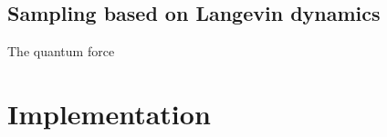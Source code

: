\documentclass[a4paper,10pt,twocolumn]{article} %
\begin{document}

\subsection{Sampling based on Langevin dynamics}%
The quantum force



\section{Implementation}%




%
%
%
\end{document}
